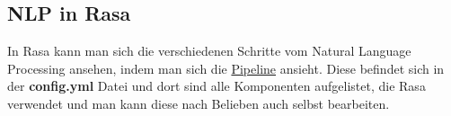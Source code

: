 \subsection{NLP in Rasa}

In Rasa kann man sich die verschiedenen Schritte vom Natural Language Processing ansehen, indem man sich die \hyperref[sec:pipeline]{Pipeline} ansieht.
Diese befindet sich in der \textbf{config.yml} Datei und dort sind alle Komponenten aufgelistet, die Rasa verwendet und man kann diese nach Belieben auch selbst bearbeiten.